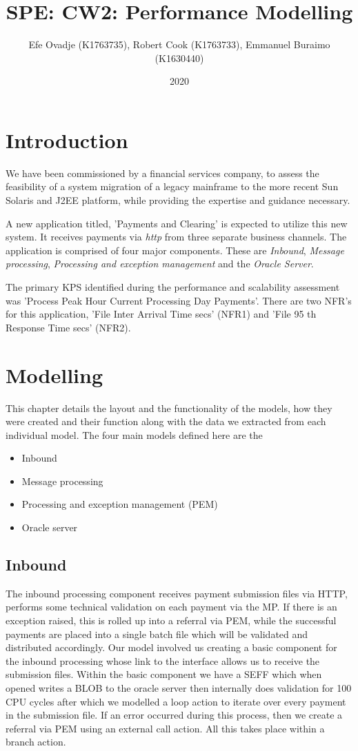 \documentclass[a4paper,11pt]{report}
\title{SPE: CW2: Performance Modelling}
\author{Efe Ovadje (K1763735), Robert Cook (K1763733), Emmanuel Buraimo (K1630440)}
\date{2020}
\begin{document}
\maketitle

\chapter*{Introduction}
We have been commissioned
by a financial services company,
to assess the feasibility of a system migration of a
legacy mainframe to the more recent Sun Solaris and
J2EE platform, while providing the expertise and guidance necessary.

A new application titled, 'Payments and Clearing' is expected to
utilize this new system.
It receives payments via \textit{http} from three separate business channels.
The application is comprised of four major components.
These are \textit{Inbound}, \textit{Message processing},
\textit{Processing and exception management} and the \textit{Oracle Server}.

The primary KPS identified during the performance and
scalability assessment was 'Process Peak Hour Current Processing Day Payments'.
There are two NFR's for this application,
'File Inter Arrival Time secs' (NFR1) and
'File 95 th Response Time secs' (NFR2).

\chapter*{Modelling}
This chapter details the layout and the functionality of the models, how they were created and their function along with the data we extracted from each individual model. The four main models defined here are the 
\begin{itemize}
  \item Inbound
  
  \item Message processing
  
  
  \item Processing and exception management (PEM)
  \item Oracle server
\end{itemize}


\section*{Inbound}
The inbound processing component receives payment submission files via HTTP, performs some technical validation on each payment via the MP. If there is an exception raised, this is rolled up into a referral via PEM, while the successful payments are placed into a single batch file which will be validated and distributed accordingly. Our model involved us creating a basic component for the inbound processing whose link to the interface allows us to receive the submission files. Within the basic component we have a SEFF which when opened writes a BLOB to the oracle server then internally does validation for 100 CPU cycles after which we modelled a loop action to iterate over every payment in the submission file. If an error occurred during this process, then we create a referral via PEM using an external call action. All this takes place within a branch action. 
\end{document}

